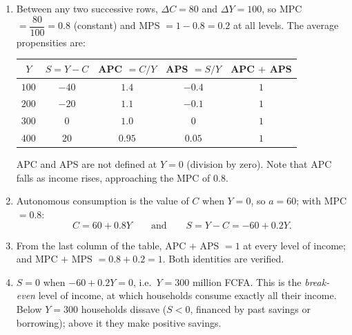 \documentclass[11pt]{article}
\begin{document}
\begin{corrige}
\begin{enumerate}
\item Between any two successive rows, $\Delta C = 80$ and $\Delta Y = 100$, so MPC $= \dfrac{80}{100} = 0.8$ (constant) and MPS $= 1 - 0.8 = 0.2$ at all levels. The average propensities are:
\begin{center}
\begin{tabular}{|c|c|c|c|c|}
\hline
$Y$ & $S = Y - C$ & APC $= C/Y$ & APS $= S/Y$ & APC $+$ APS \\
\hline
$100$ & $-40$ & $1.4$ & $-0.4$ & $1$ \\
$200$ & $-20$ & $1.1$ & $-0.1$ & $1$ \\
$300$ & $0$ & $1.0$ & $0$ & $1$ \\
$400$ & $20$ & $0.95$ & $0.05$ & $1$ \\
\hline
\end{tabular}
\end{center}
APC and APS are not defined at $Y = 0$ (division by zero). Note that APC falls as income rises, approaching the MPC of $0.8$.
\item Autonomous consumption is the value of $C$ when $Y = 0$, so $a = 60$; with MPC $= 0.8$:
\[ C = 60 + 0.8Y \qquad\text{and}\qquad S = Y - C = -60 + 0.2Y. \]
\item From the last column of the table, APC $+$ APS $= 1$ at every level of income; and MPC $+$ MPS $= 0.8 + 0.2 = 1$. Both identities are verified.
\item $S = 0$ when $-60 + 0.2Y = 0$, i.e.\ $Y = 300$ million FCFA. This is the \emph{break-even} level of income, at which households consume exactly all their income. Below $Y = 300$ households dissave ($S < 0$, financed by past savings or borrowing); above it they make positive savings.
\end{enumerate}
\end{corrige}
\end{document}
